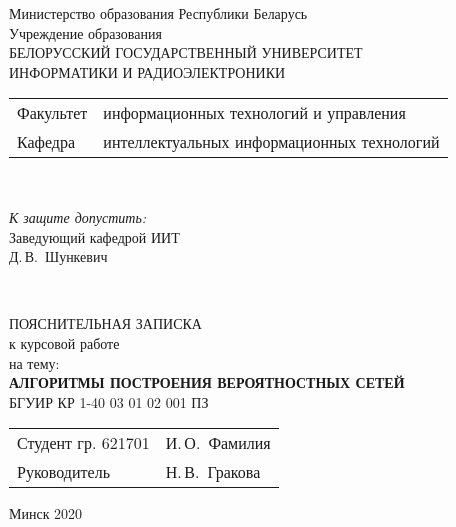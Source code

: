 \begin{titlepage}
  \begin{center}
    Министерство образования Республики Беларусь\\[1em]
    Учреждение образования\\
    БЕЛОРУССКИЙ ГОСУДАРСТВЕННЫЙ УНИВЕРСИТЕТ \\
    ИНФОРМАТИКИ И РАДИОЭЛЕКТРОНИКИ\\[1em]

    \begin{minipage}{\textwidth}
      \begin{flushleft}
        \begin{tabular}{ l l }
          Факультет & информационных технологий и управления\\
          Кафедра   & интеллектуальных информационных технологий
        \end{tabular}
      \end{flushleft}
    \end{minipage}\\[1em]

    \begin{flushright}
      \begin{minipage}{0.4\textwidth}
        \textit{К защите допустить:}\\[0.8em]
        Заведующий кафедрой ИИТ\\[0.45em]
        \underline{\hspace*{2.8cm}} Д.\,В.~Шункевич
      \end{minipage}\\[2.2em]
    \end{flushright}

    {ПОЯСНИТЕЛЬНАЯ ЗАПИСКА}\\
    {к курсовой работе}\\
    {на тему:}\\[1em]
    \textbf{\large АЛГОРИТМЫ ПОСТРОЕНИЯ ВЕРОЯТНОСТНЫХ СЕТЕЙ}\\[1em]


    {БГУИР КР 1-40 03 01 02 001 ПЗ}\\[2em]
    \vspace{2em}
    \begin{tabular}{ p{}p{} }
      Студент гр. 621701 & И.\,О.~Фамилия \\
      Руководитель & Н.\,В.~Гракова \\
    \end{tabular}
    
    \vfill
    {\normalsize Минск 2020}
  \end{center}
\end{titlepage}
